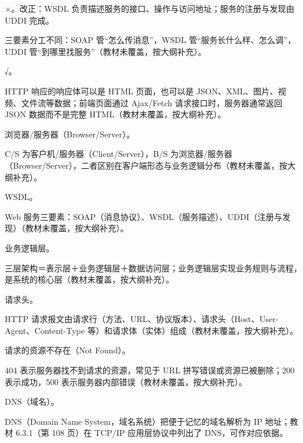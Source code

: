 \documentclass[a4paper,11pt]{article}
\begin{document}
\q ×。改正：WSDL 负责描述服务的接口、操作与访问地址；服务的注册与发现由 UDDI 完成。\begin{analysis}三要素分工不同：SOAP 管“怎么传消息”，WSDL 管“服务长什么样、怎么调”，UDDI 管“到哪里找服务”（教材未覆盖，按大纲补充）。\end{analysis}

\q √。\begin{analysis}HTTP 响应的响应体可以是 HTML 页面，也可以是 JSON、XML、图片、视频、文件流等数据；前端页面通过 Ajax/Fetch 请求接口时，服务器通常返回 JSON 数据而不是完整 HTML（教材未覆盖，按大纲补充）。\end{analysis}


\q 浏览器/服务器（Browser/Server）。\begin{analysis}C/S 为客户机/服务器（Client/Server），B/S 为浏览器/服务器（Browser/Server），二者区别在客户端形态与业务逻辑分布（教材未覆盖，按大纲补充）。\end{analysis}

\q WSDL。\begin{analysis}Web 服务三要素：SOAP（消息协议）、WSDL（服务描述）、UDDI（注册与发现）（教材未覆盖，按大纲补充）。\end{analysis}

\q 业务逻辑层。\begin{analysis}三层架构＝表示层＋业务逻辑层＋数据访问层；业务逻辑层实现业务规则与流程，是系统的核心层（教材未覆盖，按大纲补充）。\end{analysis}

\q 请求头。\begin{analysis}HTTP 请求报文由请求行（方法、URL、协议版本）、请求头（Host、User-Agent、Content-Type 等）和请求体（实体）组成（教材未覆盖，按大纲补充）。\end{analysis}

\q 请求的资源不存在（Not Found）。\begin{analysis}404 表示服务器找不到请求的资源，常见于 URL 拼写错误或资源已被删除；200 表示成功，500 表示服务器内部错误（教材未覆盖，按大纲补充）。\end{analysis}

\q DNS（域名）。\begin{analysis}DNS（Domain Name System，域名系统）把便于记忆的域名解析为 IP 地址；教材 6.3.1（第 108 页）在 TCP/IP 应用层协议中列出了 DNS，可作对应依据。\end{analysis}

\end{document}
